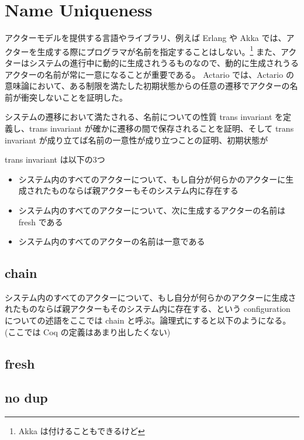 \section{Name Uniqueness}
アクターモデルを提供する言語やライブラリ、例えば Erlang や Akka では、アクターを生成する際にプログラマが名前を指定することはしない。\footnote{Akka は付けることもできるけど}
また、アクターはシステムの進行中に動的に生成されうるものなので、動的に生成されうるアクターの名前が常に一意になることが重要である。
Actario では、Actario の意味論において、ある制限を満たした初期状態からの任意の遷移でアクターの名前が衝突しないことを証明した。

システムの遷移において満たされる、名前についての性質 trans invariant を定義し、trans invariant が確かに遷移の間で保存されることを証明、そして trans invariant が成り立てば名前の一意性が成り立つことの証明、初期状態が

trans invariant は以下の3つ

\begin{itemize}
\item システム内のすべてのアクターについて、もし自分が何らかのアクターに生成されたものならば親アクターもそのシステム内に存在する
\item システム内のすべてのアクターについて、次に生成するアクターの名前は fresh である
\item システム内のすべてのアクターの名前は一意である
\end{itemize}

\subsection{chain}
システム内のすべてのアクターについて、もし自分が何らかのアクターに生成されたものならば親アクターもそのシステム内に存在する、という configuration についての述語をここでは chain と呼ぶ。論理式にすると以下のようになる。(ここでは Coq の定義はあまり出したくない)





\subsection{fresh}

\subsection{no dup}
